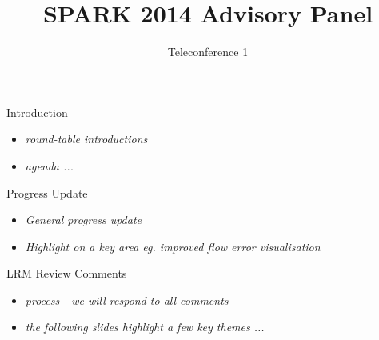 \documentclass{beamer}
\title{SPARK 2014 Advisory Panel}
\subtitle{Teleconference 1}
\begin{document}
\begin{altrantitle}
\end{altrantitle}

\begin{frame}{Introduction}

  \begin{itemize}

  \item \emph{round-table introductions}
  \item \emph{agenda ...}

  \end{itemize}

  \end{frame}

\begin{frame}{Progress Update}

  \begin{itemize}

  \item \emph{General progress update}
  \item \emph{Highlight on a key area eg. improved flow error visualisation}

  \end{itemize}

\end{frame}

\begin{frame}{LRM Review Comments}

  \begin{itemize}

  \item \emph{process - we will respond to all comments}
  \item \emph{the following slides highlight a few key themes ...}

  \end{itemize}

\end{frame}
\end{document}
